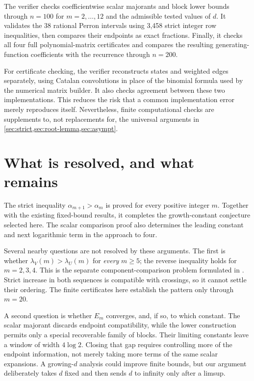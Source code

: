 \documentclass[11pt,a4paper]{article}
\theoremstyle{definition}\newaliascnt{definition}{theorem}
\theoremstyle{remark}\newaliascnt{remark}{theorem}
\begin{document}
The verifier checks coefficientwise scalar majorants and block lower bounds
through $n=100$ for $m=2,\ldots,12$ and the admissible tested values of $d$.
It validates the 38 rational Perron intervals using 3,458 strict integer
row inequalities, then compares their endpoints as exact fractions.
Finally, it checks all four full polynomial-matrix certificates and compares
the resulting generating-function coefficients with the recurrence through
$n=200$.

For certificate checking, the verifier reconstructs states and weighted
edges separately, using Catalan convolutions in place of the binomial
formula used by the numerical matrix builder. It also checks agreement
between these two implementations. This reduces the risk that a common
implementation error merely reproduces itself. Nevertheless,
finite computational checks are supplements to, not replacements for,
the universal arguments in \cref{sec:strict,sec:root-lemma,sec:asympt}.

\section{What is resolved, and what remains}
\label{sec:remaining}
The strict inequality $\alpha_{m+1}>\alpha_m$ is proved for every positive
integer $m$. Together with the existing fixed-bound results, it completes
the growth-constant conjecture selected here. The scalar comparison proof
also determines the leading constant and next logarithmic term in the
approach to four.

Several nearby questions are not resolved by these arguments. The first
is whether $\lambda_V(m)>\lambda_U(m)$ for \emph{every} $m\ge5$; the reverse
inequality holds for $m=2,3,4$. This is the separate component-comparison
problem formulated in \cite[Problem~P3]{MayamaAkita}. Strict increase in
both sequences is compatible with crossings, so it cannot settle their
ordering. The finite certificates here establish the pattern only through
$m=20$.

A second question is whether $E_m$ converges, and, if so, to which constant.
The scalar majorant discards endpoint compatibility, while the lower
construction permits only a special recoverable family of blocks. Their
limiting constants leave a window of width $4\log2$. Closing that gap
requires controlling more of the endpoint information, not merely taking
more terms of the same scalar expansions. A growing-$d$ analysis could
improve finite bounds, but our argument deliberately takes $d$ fixed and
then sends $d$ to infinity only after a limsup.
\end{document}
